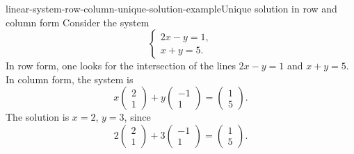\documentclass[preview]{standalone}
\begin{document}
\begin{snippetexample}{linear-system-row-column-unique-solution-example}{Unique solution in row and column form}
    Consider the system
    \[
        \begin{cases}
            2x-y=1,\\
            x+y=5.
        \end{cases}
    \]
    In row form, one looks for the intersection of the lines
    \(2x-y=1\) and \(x+y=5\). In column form, the system is
    \[
        x
        \begin{pmatrix}
            2\\
            1
        \end{pmatrix}
        +
        y
        \begin{pmatrix}
            -1\\
            1
        \end{pmatrix}
        =
        \begin{pmatrix}
            1\\
            5
        \end{pmatrix}.
    \]
    The solution is \(x=2\), \(y=3\), since
    \[
        2
        \begin{pmatrix}
            2\\
            1
        \end{pmatrix}
        +
        3
        \begin{pmatrix}
            -1\\
            1
        \end{pmatrix}
        =
        \begin{pmatrix}
            1\\
            5
        \end{pmatrix}.
    \]
\end{snippetexample}
\end{document}
